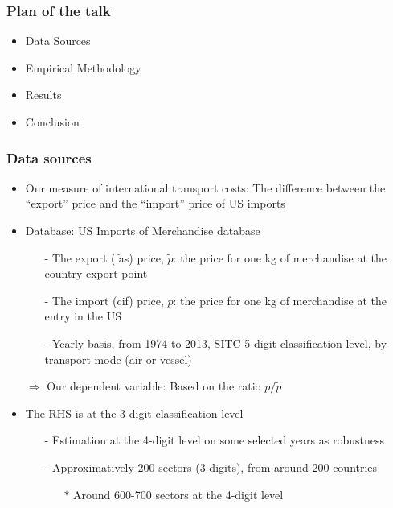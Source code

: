 \documentclass[10 pt,Helvetica, french]{beamer}
\begin{document}
\begin{frame}
\frametitle{Plan of the talk}
\begin{itemize}
\item Data Sources  \vspace{0.2cm}
\item Empirical Methodology \vspace{0.2cm}
\item Results \vspace{0.2cm}
\item Conclusion
\end{itemize}
\end{frame}


\begin{frame} [label=slide_data]
\frametitle{Data sources}
\begin{itemize}
\item Our measure of international transport costs: The difference between the ``export'' price and the ``import'' price of US imports\vspace{0.1cm}
\item Database: US Imports of Merchandise database \vspace{0.1cm}
\begin{itemize}
\item[-] The export (fas) price, $\widetilde{p}$: the price for one kg of merchandise at the country export point \vspace{0.1cm}
\item[-] The import (cif) price, $p$: the price for one kg of merchandise at the entry in the US \vspace{0.1cm}
\item[-] Yearly basis, from 1974 to 2013, SITC 5-digit classification level, by transport mode (air or vessel) \vspace{0.1cm}
\end{itemize}
\item[$\Rightarrow$] Our dependent variable: Based on the ratio $p/\widetilde{p}$ \vspace{0.1cm}
\item The RHS is at the 3-digit classification level  \vspace{0.1cm}
\begin{itemize}
\item[-] Estimation at the 4-digit level on some selected years as robustness \vspace{0.1cm}
\item[-] Approximatively 200 sectors (3 digits), from around 200 countries  \vspace{0.1cm}
\begin{itemize}
\item[$\ast$] Around 600-700 sectors at the 4-digit level
\end{itemize}
\end{itemize}
\end{itemize}
\end{frame}
\end{document}
